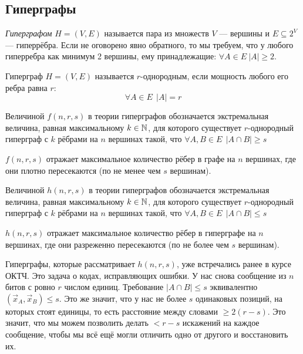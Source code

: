 \subsection{Гиперграфы}

\begin{definition}
	\textit{Гиперграфом} $H = (V, E)$ называется пара из множеств $V$ --- вершины и $E \subseteq 2^V$ --- гиперрёбра. Если не оговорено явно обратного, то мы требуем, что у любого гиперребра как минимум 2 вершины, ему принадлежащие: $\forall A \in E\ |A| \ge 2$.
\end{definition}

\begin{definition}
	Гиперграф $H = (V, E)$ называется $r$-однородным, если мощность любого его ребра равна $r$:
	\[
		\forall A \in E\ \ |A| = r
	\]
\end{definition}

\begin{definition}
	Величиной $f(n, r, s)$ в теории гиперграфов обозначается экстремальная величина, равная максимальному $k \in \mathbb{N}$, для которого существует $r$-однородный гиперграф с $k$ рёбрами на $n$ вершинах такой, что $\forall A, B \in E\ \ |A \cap B| \ge s$
\end{definition}

\begin{note}
	$f(n, r, s)$ отражает максимальное количество рёбер в графе на $n$ вершинах, где они плотно пересекаются (по не менее чем $s$ вершинам).
\end{note}

\begin{definition}
	Величиной $h(n, r, s)$ в теории гиперграфов обозначается экстремальная величина, равная максимальному $k \in \mathbb{N}$, для которого существует $r$-однородный гиперграф с $k$ рёбрами на $n$ вершинах такой, что $\forall A, B \in E\ \ |A \cap B| \le s$
\end{definition}

\begin{note}
	$h(n, r, s)$ отражает максимальное количество рёбер в гиперграфе на $n$ вершинах, где они разреженно пересекаются (по не более чем $s$ вершинам).
\end{note}

\begin{note}
	Гиперграфы, которые рассматривает $h(n, r, s)$, уже встречались ранее в курсе ОКТЧ. Это задача о кодах, исправляющих ошибки. У нас снова сообщение из $n$ битов с ровно $r$ числом единиц. Требование $|A \cap B| \le s$ эквивалентно $(\vec{x}_A, \vec{x}_B) \le s$. Это же значит, что у нас не более $s$ одинаковых позиций, на которых стоят единицы, то есть расстояние между словами $\ge 2(r - s)$. Это значит, что мы можем позволить делать $< r - s$ искажений на каждое сообщение, чтобы мы всё ещё могли отличить одно от другого и восстановить их.
\end{note}

